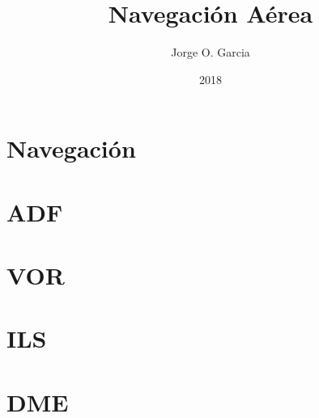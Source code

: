 \documentclass[a4paper,10pt,twoside]{book}
\title{Navegaci\'on A\'erea}
\author{Jorge O. Garcia}
\date{2018}
\begin{document}


\thispagestyle{fancy}
\maketitle

\newpage

\thispagestyle{fancy}
\tableofcontents

\newpage


\chapter{Navegaci\'on}
\label{sec:navegacion}




\chapter{ADF}
\label{sec:adf}



\chapter{VOR}
\label{sec:vor}



\chapter{ILS}
\label{sec:ils}



\chapter{DME}
\label{sec:d,e}
\end{document}
